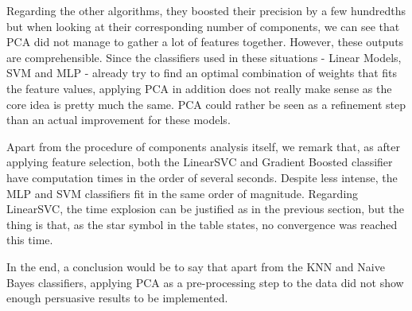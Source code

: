 Regarding the other algorithms, they boosted their precision by a few hundredths but when looking at their corresponding number of components, we can see that PCA did not manage to gather a lot of features together. However, these outputs are comprehensible. Since the classifiers used in these situations - Linear Models, SVM and MLP - already try to find an optimal combination of weights that fits the feature values, applying PCA in addition does not really make sense as the core idea is pretty much the same. PCA could rather be seen as a refinement step than an actual improvement for these models.

Apart from the procedure of components analysis itself, we remark that, as after applying feature selection, both the LinearSVC and Gradient Boosted classifier have computation times in the order of several seconds. Despite less intense, the MLP and SVM classifiers fit in the same order of magnitude. Regarding LinearSVC, the time explosion can be justified as in the previous section, but the thing is that, as the star symbol in the table states, no convergence was reached this time.

In the end, a conclusion would be to say that apart from the KNN and Naive Bayes classifiers, applying PCA as a pre-processing step to the data did not show enough persuasive results to be implemented.





